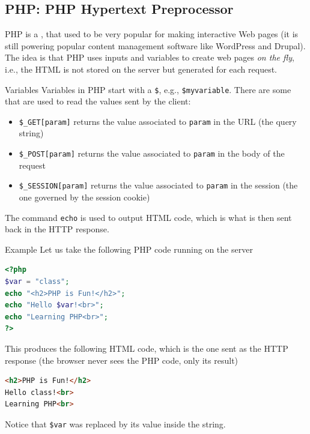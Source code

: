 \subsection{PHP: PHP Hypertext Preprocessor}
PHP is a , that used to be very popular for making interactive Web pages (it is still powering popular content management software like WordPress and Drupal). The idea is that PHP uses inputs and variables to create web pages \textit{on the fly}, i.e., the HTML is not stored on the server but generated for each request.

\begin{parag}{Variables}
    Variables in PHP start with a \texttt{\$}, e.g., \texttt{\$myvariable}. There are some  that are used to read the values sent by the client:
    \begin{itemize}
        \item \texttt{\$\_GET[param]} returns the value associated to \texttt{param} in the URL (the query string)
        \item \texttt{\$\_POST[param]} returns the value associated to \texttt{param} in the body of the request
        \item \texttt{\$\_SESSION[param]} returns the value associated to \texttt{param} in the session (the one governed by the session cookie)
    \end{itemize}
    The command \texttt{echo} is used to output HTML code, which is what is then sent back in the HTTP response.
\end{parag}

\begin{parag}{Example}
    Let us take the following PHP code running on the server
    \begin{lstlisting}[language=PHP]
<?php
$var = "class";
echo "<h2>PHP is Fun!</h2>";
echo "Hello $var!<br>";
echo "Learning PHP<br>";
?>
    \end{lstlisting}
    This produces the following HTML code, which is the one sent as the HTTP response (the browser never sees the PHP code, only its result)
    \begin{lstlisting}[language=HTML]
<h2>PHP is Fun!</h2>
Hello class!<br>
Learning PHP<br>
    \end{lstlisting}
    Notice that \texttt{\$var} was replaced by its value inside the string.
\end{parag}

